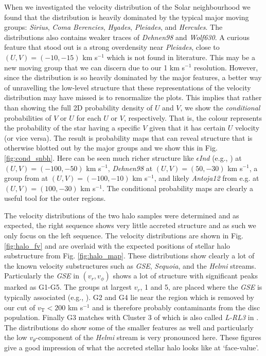 When we investigated the velocity distribution of the Solar neighbourhood we found that the distribution is heavily dominated by the typical major moving groups: \textit{Sirius}, \textit{Coma Berencies}, \textit{Hyades}, \textit{Pleiades}, and \textit{Hercules}. The distributions also contains weaker traces of \textit{Dehnen98} and \textit{Wolf630}. A curious feature that stood out is a strong overdensity near \textit{Pleiades}, close to $(U, V) = (-10, -15)$ km s$^{-1}$ which is not found in literature. This may be a new moving group that we can discern due to our 1 km s$^{-1}$ resolution. However, since the distribution is so heavily dominated by the major features, a better way of unravelling the low-level structure that these representations of the velocity distribution may have missed is to renormalize the plots. This implies that rather than showing the full 2D probability density of $U$ and $V$, we show the \emph{conditional} probabilities of $V$ or $U$ for each $U$ or $V$, respectively. That is, the colour represents the probability of the star having a specific $V$ given that it has certain $U$ velocity (or vice versa). The result is probability maps that can reveal structure that is otherwise blotted out by the major groups and we show this in Fig. \ref{fig:cond_snbh}. Here can be seen much richer structure like $\epsilon$\textit{Ind} (e.g., \citealt{antoja:12, kushniruk:17, bobylev:16}) at $(U, V) = (-100, -50)$ km s$^{-1}$, \textit{Dehnen98} \citep{antoja:12} at $(U, V) = (50, -30)$ km s$^{-1}$, a group from \cite{bobylev:16} at $(U, V) = (-100, -10)$ km s$^{-1}$, and likely \textit{Antoja12} from e.g. \cite{kushniruk:17} at $(U, V) = (100, -30)$ km s$^{-1}$. The conditional probability maps are clearly a useful tool for the outer regions.

The velocity distributions of the two halo samples were determined and as expected, the right sequence shows very little accreted structure and as such we only focus on the left sequence. The velocity distributions are shown in Fig. \ref{fig:halo_fv} and are overlaid with the expected positions of stellar halo substructure from Fig. \ref{fig:halo_map}. These distributions show clearly a lot of the known velocity substructures such as \textit{GSE}, \textit{Sequoia}, and the \textit{Helmi} streams. Particularly the \textit{GSE} in $(v_r, v_\phi)$ shows a lot of structure with significant peaks marked as G1-G5. The groups at largest $v_r$, 1 and 5, are placed where the \textit{GSE} is typically associated (e.g., \citealt{feuillet:21}). G2 and G4 lie near the region which is removed by our cut of $v_\mathrm{T} < 200$ km s$^{-1}$ and is therefore probably contaminants from  the disc population. Finally G3 matches with Cluster 3 of \cite{lovdal:22} which is also called \textit{L-RL3} in \cite{dodd:22}. The distributions do show some of the smaller features as well and particularly the low $v_\theta$-component of the \textit{Helmi} stream is very pronounced here. These figures give a good impression of what the accreted stellar halo looks like at `face-value'.

